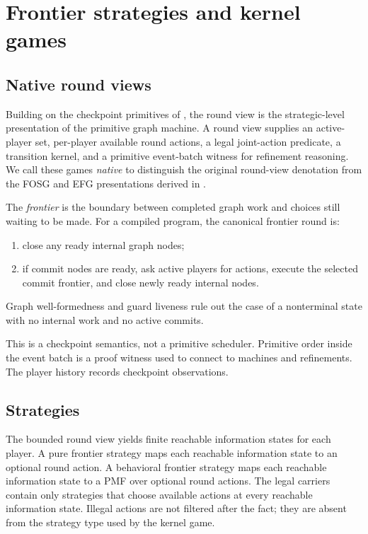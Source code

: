 \section{Frontier strategies and kernel games}
\label{sec:frontier-strategies}

\subsection{Native round views}

Building on the checkpoint primitives of ,
the round view is the strategic-level presentation of the primitive
graph machine.  A round view supplies an active-player set, per-player
available round actions, a legal joint-action predicate, a transition
kernel, and a primitive event-batch witness for refinement reasoning.
We call these games \emph{native} to distinguish the original round-view
denotation from the FOSG and EFG presentations derived in
.

The \emph{frontier} is the boundary between completed graph work and
choices still waiting to be made.  For a compiled program, the canonical
frontier round is:
\begin{enumerate}[label=(\alph*),leftmargin=1.7em,itemsep=1pt]
\item close any ready internal graph nodes;
\item if commit nodes are ready, ask active players for actions, execute
  the selected commit frontier, and close newly ready internal nodes.
\end{enumerate}
Graph well-formedness and guard liveness rule out the case of a
nonterminal state with no internal work and no active commits.

This is a checkpoint semantics, not a primitive scheduler.  Primitive
order inside the event batch is a proof witness used to connect to
machines and refinements.  The player history records checkpoint
observations.

\subsection{Strategies}
\label{sec:frontier-strategies-strategies}

The bounded round view yields finite reachable information states for
each player.  A pure frontier strategy maps each reachable information
state to an optional round action.  A behavioral frontier strategy maps
each reachable information state to a PMF over optional round actions.
The legal carriers contain only strategies that choose available actions
at every reachable information state.  Illegal actions are not filtered
after the fact; they are absent from the strategy type used by the
kernel game.

